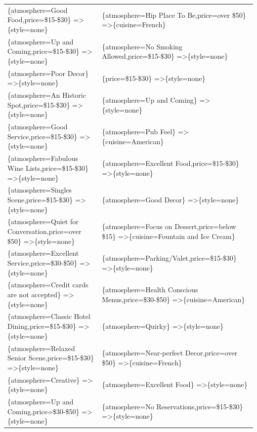 \documentclass[letterpaper,10pt]{article}
\begin{document}
\begin{appendices}
\begin{table}[h]
\begin{adjustbox}{max width=\textwidth}
\begin{tabular}{ll}
\{atmosphere=Good Food,price=\$15-\$30\} =\textgreater \{style=none\} & \{atmosphere=Hip Place To Be,price=over \$50\} =\textgreater \{cuisine=French\} \\ 
\{atmosphere=Up and Coming,price=\$15-\$30\} =\textgreater \{style=none\} & \{atmosphere=No Smoking Allowed,price=\$15-\$30\} =\textgreater \{style=none\} \\ 
\{atmosphere=Poor Decor\} =\textgreater \{style=none\} & \{price=\$15-\$30\} =\textgreater \{style=none\} \\ 
\{atmosphere=An Historic Spot,price=\$15-\$30\} =\textgreater \{style=none\} & \{atmosphere=Up and Coming\} =\textgreater \{style=none\} \\ 
\{atmosphere=Good Service,price=\$15-\$30\} =\textgreater \{style=none\} & \{atmosphere=Pub Feel\} =\textgreater \{cuisine=American\} \\ 
\{atmosphere=Fabulous Wine Lists,price=\$15-\$30\} =\textgreater \{style=none\} & \{atmosphere=Excellent Food,price=\$15-\$30\} =\textgreater \{style=none\} \\ 
\{atmosphere=Singles Scene,price=\$15-\$30\} =\textgreater \{style=none\} & \{atmosphere=Good Decor\} =\textgreater \{style=none\} \\ 
\{atmosphere=Quiet for Conversation,price=over \$50\} =\textgreater \{style=none\} & \{atmosphere=Focus on Dessert,price=below \$15\} =\textgreater \{cuisine=Fountain and Ice Cream\} \\ 
\{atmosphere=Excellent Service,price=\$30-\$50\} =\textgreater \{style=none\} & \{atmosphere=Parking/Valet,price=\$15-\$30\} =\textgreater \{style=none\} \\ 
\{atmosphere=Credit cards are not accepted\} =\textgreater \{style=none\} & \{atmosphere=Health Conscious Menus,price=\$30-\$50\} =\textgreater \{cuisine=American\} \\ 
\{atmosphere=Classic Hotel Dining,price=\$15-\$30\} =\textgreater \{style=none\} & \{atmosphere=Quirky\} =\textgreater \{style=none\} \\ 
\{atmosphere=Relaxed Senior Scene,price=\$15-\$30\} =\textgreater \{style=none\} & \{atmosphere=Near-perfect Decor,price=over \$50\} =\textgreater \{cuisine=French\} \\ 
\{atmosphere=Creative\} =\textgreater \{style=none\} & \{atmosphere=Excellent Food\} =\textgreater \{style=none\} \\ 
\{atmosphere=Up and Coming,price=\$30-\$50\} =\textgreater \{style=none\} & \{atmosphere=No Reservations,price=\$15-\$30\} =\textgreater \{style=none\} \\ 

\end{tabular}
\end{adjustbox}
\end{table}
\end{appendices}
\end{document}
